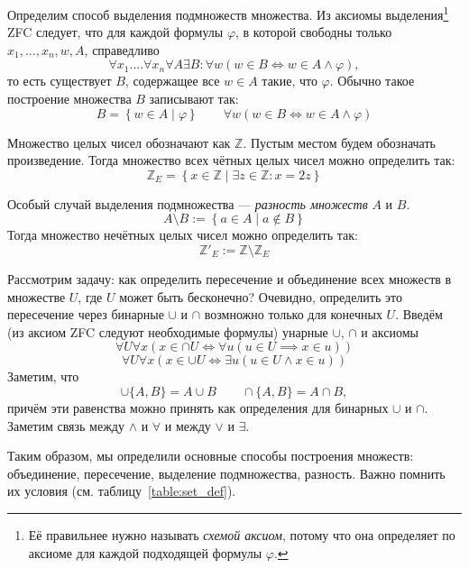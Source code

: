 Определим способ выделения подмножеств множества.
Из аксиомы выделения\footnote{Её правильнее нужно называть {\it схемой аксиом},
потому что она определяет по аксиоме для каждой подходящей формулы $\varphi$.}
ZFC следует, что для каждой формулы $\varphi$, в которой свободны
только $x_1,...,x_{n},w,A$, справедливо
\[
	\forall x_1....\forall x_{n}\forall A\exists B:\forall w(w\in B\iff
	w\in A\land \varphi),
\]
то есть существует $B$, содержащее все $w\in A$ такие, что $\varphi$.
Обычно такое построение множества $B$ записывают так:
\[
	B=\left\{w\in A\;\big|\;\varphi\right\}\qquad
	\forall w(w\in B\iff w\in A\land \varphi)
\]

\newcommand\Z{\mathbb Z}
Множество целых чисел обозначают как $\Z$.
Пустым местом будем обозначать произведение. Тогда
множество всех чётных целых чисел можно определить так:
\[
	\Z_{E}=\left\{x\in\Z\;\big|\;\exists z\in\Z:x=2z\right\}
\]

Особый случай выделения подмножества --- {\it разность множеств} $A$ и $B$.
\[
	A\setminus B:=\left\{a\in A\;\big|\; a\notin B\right\}
\]
Тогда множество нечётных целых чисел можно определить так:
\[
	\Z'_{E}:=\Z\setminus \Z_E
\]

Рассмотрим задачу: как определить пересечение и объединение
всех множеств в множестве $U$, где $U$ может быть бесконечно?
Очевидно, определить это пересечение через бинарные $\cup$ и $\cap$
возмножно только для конечных $U$.
Введём (из аксиом ZFC следуют необходимые формулы) унарные $\cup$, $\cap$
и аксиомы
\[
	\forall U\forall x(x\in \cap U\iff \forall u(u\in U\implies x\in u))
\]
\[
	\forall U\forall x(x\in \cup U\iff \exists u(u\in U\land x\in u))
\]
Заметим, что
\[
	\cup \{A,B\}=A\cup B\qquad \cap \{A,B\}=A\cap B,
\]
причём эти равенства можно принять как определения для бинарных $\cup$ и $\cap$.
Заметим связь между $\land$ и $\forall$ и между $\lor$ и $\exists$.

Таким образом, мы определили основные способы построения множеств:
объединение, пересечение, выделение подмножества, разность.
Важно помнить их условия (см. таблицу~\ref{table:set_def}).


